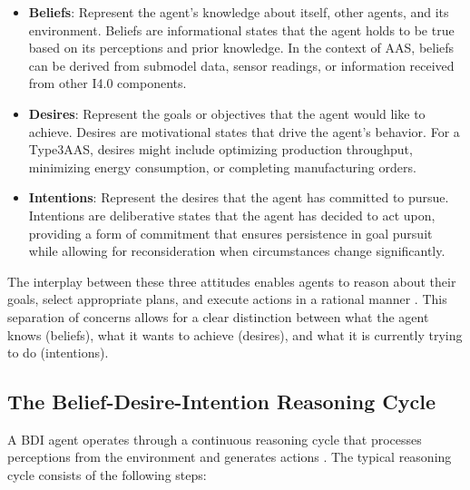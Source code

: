 \begin{itemize}
    \item \textbf{Beliefs}: Represent the agent's knowledge about itself, other agents, and its environment. Beliefs are informational states that the agent holds to be true based on its perceptions and prior knowledge. In the context of \ac{AAS}, beliefs can be derived from submodel data, sensor readings, or information received from other I4.0 components.
    
    \item \textbf{Desires}: Represent the goals or objectives that the agent would like to achieve. Desires are motivational states that drive the agent's behavior. For a \ac{Type3AAS}, desires might include optimizing production throughput, minimizing energy consumption, or completing manufacturing orders.
    
    \item \textbf{Intentions}: Represent the desires that the agent has committed to pursue. Intentions are deliberative states that the agent has decided to act upon, providing a form of commitment that ensures persistence in goal pursuit while allowing for reconsideration when circumstances change significantly.
\end{itemize}

The interplay between these three attitudes enables agents to reason about their goals, select appropriate plans, and execute actions in a rational manner \cite{rao1995bdi}. This separation of concerns allows for a clear distinction between what the agent knows (beliefs), what it wants to achieve (desires), and what it is currently trying to do (intentions).

\subsection{The Belief-Desire-Intention Reasoning Cycle}

A \ac{BDI} agent operates through a continuous reasoning cycle that processes perceptions from the environment and generates actions \cite{bordini2007programming}. The typical reasoning cycle consists of the following steps:

